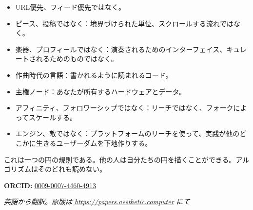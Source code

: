 \documentclass[10pt,letterpaper,twocolumn]{article}
\begin{document}
\begin{itemize}
  \item URL優先、フィード優先ではなく。
  \item ピース、投稿ではなく：境界づけられた単位、スクロールする流れではなく。
  \item 楽器、プロフィールではなく：演奏されるためのインターフェイス、キュレートされるためのものではなく。
  \item 作曲時代の言語：書かれるように読まれるコード。
  \item 主権ノード：あなたが所有するハードウェアとデータ。
  \item アフィニティ、フォロワーシップではなく：リーチではなく、フォークによってスケールする。
  \item エンジン、敵ではなく：プラットフォームのリーチを使って、実践が他のどこかに生きるユーザーダムを下地作りする。
\end{itemize}

これは一つの円の規則である。他の人は自分たちの円を描くことができる。アルゴリズムはそのどれも読めない。

\vspace{0.5em}
\noindent\textbf{ORCID:} \href{https://orcid.org/0009-0007-4460-4913}{0009-0007-4460-4913}

\vspace{0.5em}
\noindent\textit{英語から翻訳。原版は \url{https://papers.aesthetic.computer} にて}



\end{document}
